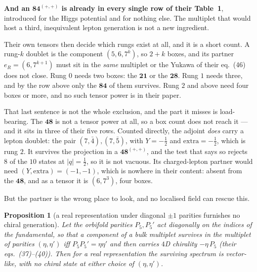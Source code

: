 \documentclass[11pt,a4paper]{article}
\newtheorem{proposition}{Proposition}
\newcommand{\rep}[1]{\mathbf{#1}}
\newenvironment{keyeq}
  {\begin{center}\setlength{\fboxsep}{9pt}\setlength{\fboxrule}{0.8pt}%
   \begin{lrbox}{\keyeqbox}\begin{minipage}{0.88\textwidth}}
  {\end{minipage}\end{lrbox}%
   \fcolorbox{hdrblue!55}{hdrblue!6}{\usebox{\keyeqbox}}\end{center}}
\begin{document}
\begin{keyeq}
\textbf{And an $\rep{84}^{(+,+)}$ is already in every single row of their Table~1}, introduced for
the Higgs potential and for nothing else. The multiplet that would host a third, inequivalent lepton
generation is not a new ingredient.
\end{keyeq}

Their own tensors then decide which rungs exist at all, and it is a short count. A rung-$k$ doublet
is the component $(5,6,7^k)$, so $2+k$ boxes, and its partner $e_R=(6,7^{k+1})$ must sit in the
\emph{same} multiplet or the Yukawa of their eq.~(46) does not close. Rung $0$ needs two boxes: the
$\rep{21}$ or the $\rep{28}$. Rung $1$ needs three, and by the row above only the $\rep{84}$ of them
survives. Rung $2$ and above need four boxes or more, and no such tensor power is in their paper.

That last sentence is not the whole exclusion, and the part it misses is load-bearing. The
$\rep{48}$ is not a tensor power at all, so a box count does not reach it --- and it sits in three of
their five rows. Counted directly, the adjoint \emph{does} carry a lepton doublet: the pair
$(7,\bar4),(7,\bar5)$, with $Y=-\tfrac12$ and $\mathrm{extra}=-\tfrac12$, which is rung $2$. It
survives the projection in a $\rep{48}^{(+,+)}$, and the test that says so rejects $8$ of the $10$
states at $|q|=\tfrac12$, so it is not vacuous. Its charged-lepton partner would need
$(Y,\mathrm{extra})=(-1,-1)$, which is nowhere in their content: absent from the $\rep{48}$, and as a
tensor it is $(6,7^3)$, four boxes.

But the partner is the wrong place to look, and no localised field can rescue this.

\begin{proposition}[a real representation under diagonal $\pm1$ parities furnishes no chiral
generation]\label{prop:real}
Let the orbifold parities $P_5,P_5'$ act diagonally on the indices of the fundamental, so that a
component of a bulk multiplet survives in the multiplet of parities $(\eta,\eta')$ iff
$P_5P_5'=\eta\eta'$ and then carries $4$D chirality $-\eta\,P_5$ (their eqs.~(37)--(40)). Then for a
\emph{real} representation the surviving spectrum is vector-like, with no chiral state at either
choice of $(\eta,\eta')$.
\end{proposition}
\end{document}
